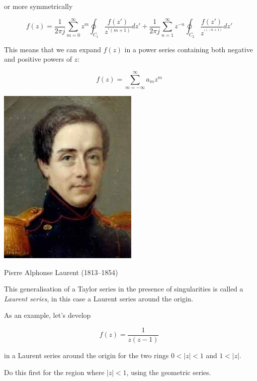 or more symmetrically

\begin{equation}
f(z)=\frac{1}{2 \pi j } \sum_{m=0}^{\infty} z^m \oint_{{C}_1} \frac{f(z')}{z^{\prime (m+1)}} dz' + \frac{1}{2 \pi j } \sum_{n=1}^{\infty} z ^ {-n} \oint_{{C}_2} \frac{f(z')}{z^{\prime^ {(-n+1)}}} dz'
\label{eq-laurent-int}
\end{equation} 

This means that we can expand $f(z)$ in a power series containing both negative and positive powers of $z$:

\begin{equation}
f(z)= \sum_{m=-\infty}^{\infty} a_m z^m
\end{equation} 

\begin{marginfigure}[-.0cm]
  \includegraphics{complex/figures/pierre_laurent}
  \caption{Pierre Alphonse Laurent (1813–1854)}
\end{marginfigure}

This generalisation of a Taylor series in the presence of singularities is called a \emph{Laurent series}, in this case a Laurent series around the origin.


As an example, let's develop

$$f(z)=\frac{1}{z(z-1)}$$

in a Laurent series around the origin for the two rings $0 < | z | < 1$ and $ 1 < |z|$.

\begin{cue}
Do this first for the region where  $| z | < 1$, using the geometric series.
\end{cue}

